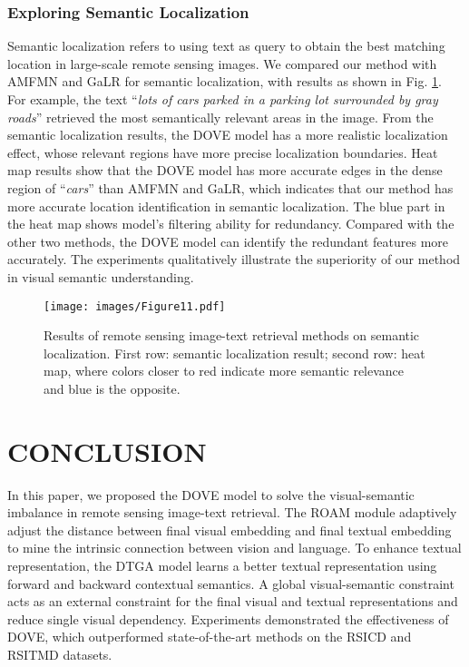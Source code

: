 \documentclass[journal]{IEEEtran}
\begin{document}
\subsubsection{Exploring Semantic Localization}
Semantic localization \cite{yuan2022learning} refers to using text as query to obtain the best matching location in large-scale remote sensing images. We compared our method with AMFMN \cite{yuan2022exploring} and GaLR \cite{yuan2022remote} for semantic localization, with results as shown in Fig. \ref{fig:fig8}. For example, the text ``\emph{lots of cars parked in a parking lot surrounded by gray roads}'' retrieved the most semantically relevant areas in the image. From the semantic localization results, the DOVE model has a more realistic localization effect, whose relevant regions have more precise localization boundaries. Heat map results show that the DOVE model has more accurate edges in the dense region of ``\emph{cars}'' than AMFMN and GaLR, which indicates that our method has more accurate location identification in semantic localization. The blue part in the heat map shows model's filtering ability for redundancy. Compared with the other two methods, the DOVE model can identify the redundant features more accurately. The experiments qualitatively illustrate the superiority of our method in visual semantic understanding.
\begin{figure}[t]
  \centering
  \texttt{[image: images/Figure11.pdf]}
  \caption{Results of remote sensing image-text retrieval methods on semantic localization. First row: semantic localization result; second row: heat map, where colors closer to red indicate more semantic relevance and blue is the opposite.}
  \label{fig:fig8}
\end{figure}

\section{CONCLUSION}
In this paper, we proposed the DOVE model to solve the visual-semantic imbalance in remote sensing image-text retrieval. The ROAM module adaptively adjust the distance between final visual embedding and final textual embedding to mine the intrinsic connection between vision and language. To enhance textual representation, the DTGA model learns a better textual representation using forward and backward contextual semantics. A global visual-semantic constraint acts as an external constraint for the final visual and textual representations and reduce single visual dependency. Experiments demonstrated the effectiveness of DOVE, which outperformed state-of-the-art methods on the RSICD and RSITMD datasets.
\end{document}
